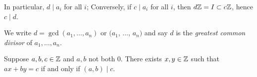 \documentclass[a4paper, 10pt, twocolumn]{amsart}
\begin{document}
In particular, $d \mid a_i$ for all $i$; Conversely, if $c \mid a_i$ for all $i$, then $d \mathbb{Z} = I \subset c \mathbb{Z}$, hence $c \mid d$.

\begin{definition}
  We write $d = \gcd(a_1, \dots, a_n)$ or $(a_1$, $\dots$, $a_n)$ and say $d$ is the \emph{greatest common divisor} of $a_1, \dots, a_n$.
\end{definition}

\begin{corollary}[Bézout]
  Suppose $a, b, c \in \mathbb{Z}$ and $a, b$ not both 0. There exists $x, y \in \mathbb{Z}$ such that $ax + by = c$ if and only if $(a, b) \mid c$.
\end{corollary}



\end{document}
